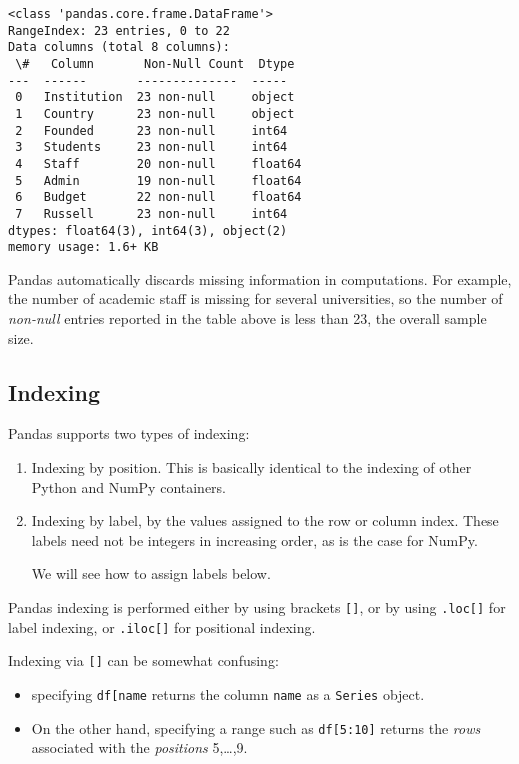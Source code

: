 \documentclass{scrartcl}
\providecommand{\tightlist}{%
      \setlength{\itemsep}{0pt}\setlength{\parskip}{0pt}}
\begin{document}
    \begin{Verbatim}[commandchars=\\\{\}]
<class 'pandas.core.frame.DataFrame'>
RangeIndex: 23 entries, 0 to 22
Data columns (total 8 columns):
 \#   Column       Non-Null Count  Dtype
---  ------       --------------  -----
 0   Institution  23 non-null     object
 1   Country      23 non-null     object
 2   Founded      23 non-null     int64
 3   Students     23 non-null     int64
 4   Staff        20 non-null     float64
 5   Admin        19 non-null     float64
 6   Budget       22 non-null     float64
 7   Russell      23 non-null     int64
dtypes: float64(3), int64(3), object(2)
memory usage: 1.6+ KB
    \end{Verbatim}

    Pandas automatically discards missing information in computations. For
example, the number of academic staff is missing for several
universities, so the number of \emph{non-null} entries reported in the
table above is less than 23, the overall sample size.


\hypertarget{indexing}{%
\subsection{Indexing}\label{indexing}}

Pandas supports two types of indexing:

\begin{enumerate}
\def\labelenumi{\arabic{enumi}.}
\item
  Indexing by position. This is basically identical to the indexing of
  other Python and NumPy containers.
\item
  Indexing by label, \ie by the values assigned to the row or column
  index. These labels need not be integers in increasing order, as is
  the case for NumPy.

  We will see how to assign labels below.
\end{enumerate}

Pandas indexing is performed either by using brackets \texttt{{[}{]}},
or by using \texttt{.loc{[}{]}} for label indexing, or
\texttt{.iloc{[}{]}} for positional indexing.

Indexing via \texttt{{[}{]}} can be somewhat confusing:

\begin{itemize}
\tightlist
\item
  specifying \texttt{df{[}\textquotesingle{}name\textquotesingle{}{]}}
  returns the column \texttt{name} as a \texttt{Series} object.
\item
  On the other hand, specifying a range such as \texttt{df{[}5:10{]}}
  returns the \emph{rows} associated with the \emph{positions}
  5,\ldots{},9.
\end{itemize}
\end{document}
